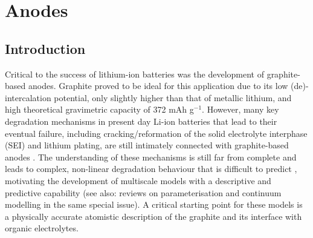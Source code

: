 \documentclass[../main.tex]{subfiles}
\begin{document}
\section{Anodes}
\label{sec:anodes}


\subsection{Introduction}
\label{sec:anodes_intro}

Critical to the success of lithium-ion batteries was the development of graphite-based anodes. Graphite proved to be ideal for this application due to its low (de)-intercalation potential, only slightly higher than that of metallic lithium, and high theoretical gravimetric capacity of 372 mAh g$^{-1}$. However, many key degradation mechanisms in present day Li-ion batteries that lead to their eventual failure, including cracking/reformation of the solid electrolyte interphase (SEI) and lithium plating, are still intimately connected with graphite-based anodes \cite{VETTER2005269,ma6041310}. The understanding of these mechanisms is still far from complete and leads to complex, non-linear degradation behaviour that is difficult to predict \cite{YANG201728}, motivating the development of multiscale models with a descriptive and predictive capability (see also: reviews on parameterisation and continuum modelling in the same special issue). A critical starting point for these models is a physically accurate atomistic description of the graphite and its interface with organic electrolytes. 
\end{document}
